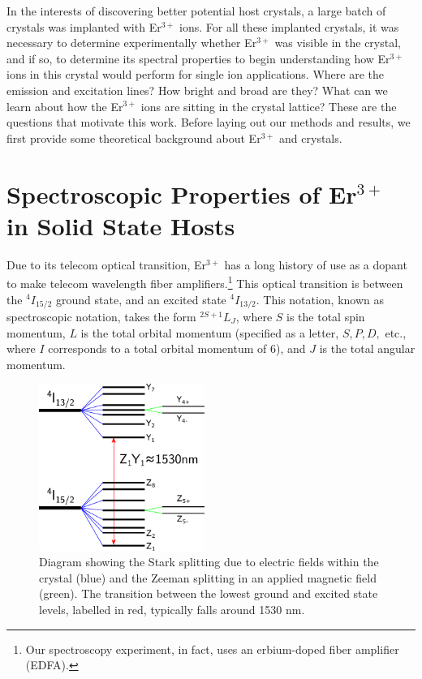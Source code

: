\documentclass[12pt]{puthesis}
\newcommand{\erbium}[1][ ]{Er$^{3+}$#1}
\begin{document}
In the interests of discovering better potential host crystals, a large batch of crystals was implanted with \erbium ions. For all these implanted crystals, it was necessary to determine experimentally whether \erbium was visible in the crystal, and if so, to determine its spectral properties to begin understanding how \erbium ions in this crystal would perform for single ion applications. Where are the emission and excitation lines? How bright and broad are they? What can we learn about how the \erbium ions are sitting in the crystal lattice? These are the questions that motivate this work. Before laying out our methods and results, we first provide some theoretical background about \erbium and crystals.

\section{Spectroscopic Properties of \erbium in Solid State Hosts}
\label{sec:spectr-prop-erbi}

Due to its telecom optical transition, \erbium has a long history of use as a dopant to make telecom wavelength fiber amplifiers.\footnote{Our spectroscopy experiment, in fact, uses an erbium-doped fiber amplifier (EDFA).} This optical transition is between the $^{4}I_{15/2}$ ground state, and an excited state $^{4}I_{13/2}$. This notation, known as spectroscopic notation, takes the form $^{2S+1}L_{J}$, where $S$ is the total spin momentum, $L$ is the total orbital momentum (specified as a letter, $S, P, D,$ etc., where $I$ corresponds to a total orbital momentum of 6), and $J$ is the total angular momentum. 

\begin{figure}
  \centering
  \includegraphics[width=0.48\textwidth]{EnergyLevelDiagram}
  \caption{Diagram showing the Stark splitting due to electric fields within the crystal (blue) and the Zeeman splitting in an applied magnetic field (green). The transition between the lowest ground and excited state levels, labelled in red, typically falls around 1530 nm.}
  \label{fig:energyleveldiagram}
\end{figure}
\end{document}
